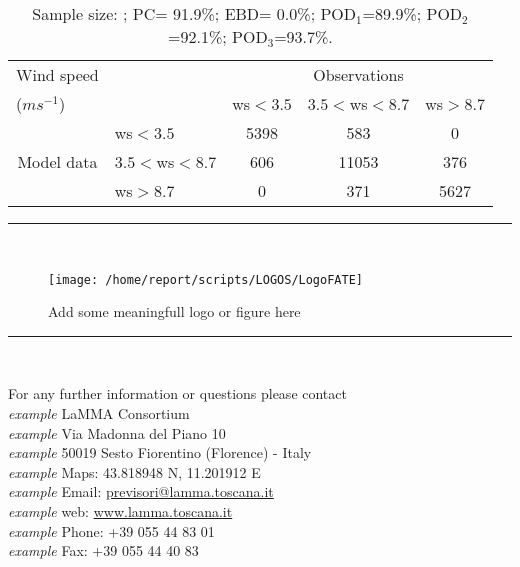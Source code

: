 \documentclass[11pt,english]{article}
\newcommand{\HRule}{\rule{\linewidth}{0.5mm}}
\begin{document}
\begin{table}[tbp]
\begin{center}
\begin{tabular}{llccc}
\hline
{Wind speed}                                       &                                                    & \multicolumn{3}{c}{Observations}                 \\
{($m s^{-1}$)}                                       &                             & ws$<3.5$   & $3.5<$ws$<8.7$ & ws$>8.7$ \\
\hline
\multicolumn{1}{c}{\multirow{3}{*}{Model data}}  & ws$<3.5$          & 5398                & 583                       & 0              \\
                                                 & $3.5<$ws$<8.7$ & 606                & 11053                       & 376              \\
                                                 & ws$>8.7$          & 0                & 371                       & 5627              \\
\hline
\end{tabular}
\end{center}
\caption{Sample size: ; PC= 91.9\%; EBD= 0.0\%; POD$_1$=89.9\%; POD$_2$=92.1\%; POD$_3$=93.7\%.}\label{tab:contingency}
\end{table}

\clearpage

\begin{center}
\HRule \\[0.4cm]
\begin{figure}[htbp]
\centering
{\texttt{[image: /home/report/scripts/LOGOS/LogoFATE]}}
\caption{Add some meaningfull logo or figure here}
\end{figure}
\HRule \\[0.4cm]
\end{center}

\vspace{5.55cm}
\begin{flushright}
\large{For any further information or questions please contact
\\\textit{example} LaMMA Consortium
\\\textit{example} Via Madonna del Piano 10
\\\textit{example} 50019 Sesto Fiorentino (Florence) - Italy
\\\textit{example} Maps: 43.818948 N, 11.201912 E
\\\textit{example} Email: \href{mailto:previsori@lamma.toscana.it}{previsori@lamma.toscana.it}
\\\textit{example} web: \href{www.lamma.toscana.it}{www.lamma.toscana.it}
\\\textit{example} Phone: +39 055 44 83 01
\\\textit{example} Fax: +39 055 44 40 83}
\end{flushright}

\end{document}

